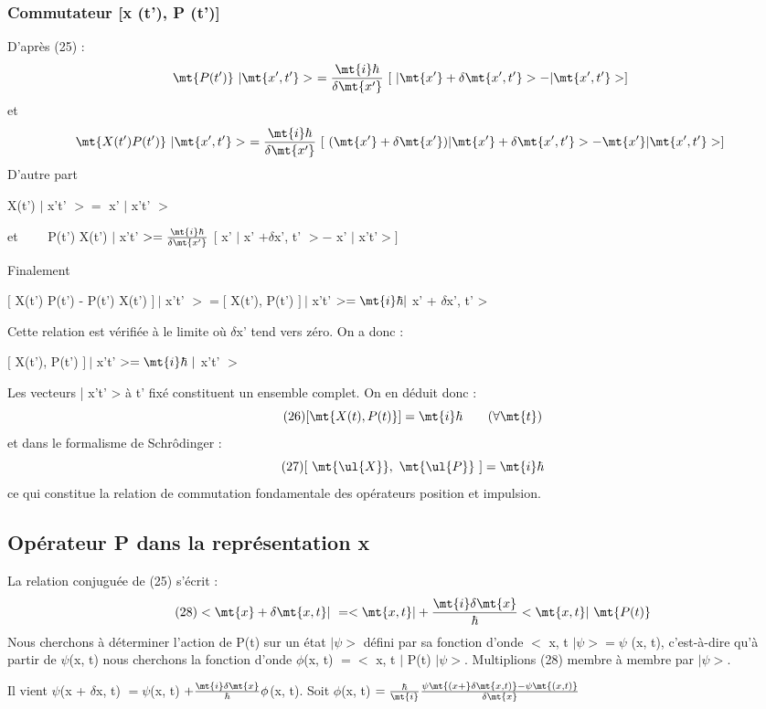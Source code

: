 \subsubsection{Commutateur [x (t'), P (t')]}%
D'après (25) :
\[
\mt{P(t')}\ |\mt{ x', t'}>\ =\frac{\mt{i}\hbar}{\delta\mt{x'}}\ 
[\ |\mt{ x'}+\delta \mt{x', t'}>-|\mt{x', t'}>]
\]
et
\[
\mt{X(t') P(t')}\ |\mt{ x', t'}>\ =
\frac{\mt{i}\hbar}{\delta\mt{x'}}\ 
[\ (\mt{ x'}+\delta \mt{x'})|\mt{ x'}+\delta \mt{x', t'}>-
\mt{ x'}|\mt{x', t'}>]
\]
D'autre part
\begin{center}
X(t') $|$ x't' $> =$ x' $|$ x't' $>$

et \ \ \ \ P(t') X(t') $|$ x't' $> = \frac{\mt{i}\hbar}{\delta\mt{x'}}$
$[$ x' $|$ x' $+ \delta$x', t' $> -$ x' $|$ x't'$>]$
\end{center}
Finalement
\begin{center}
$[$ X(t') P(t') - P(t') X(t') $]\ |$ x't' $> = [$ X(t'), P(t') $]\ |$ x't' $> = \mt{i}\hbar |$ x' + $\delta$x', t' >
\end{center}
Cette relation est vérifiée à le limite où $\delta$x' tend vers zéro.
On a donc :
\begin{center}
$[$ X(t'), P(t') $]\ |$ x't' $> = \mt{i}\hbar\ |$ x't' $>$
\end{center}
Les vecteurs | x't' > à t' fixé constituent un ensemble complet.
On en déduit donc :
\[
\tag{26}[\mt{ X(t), P(t) }]=\mt{i}\hbar\ \ \ \ \ \ (\forall\mt{t})
\]
et dans le formalisme de Schrôdinger :
\[
\tag{27}[\ \mt{\ul{X}},\ \mt{\ul{P}}\ ]=\mt{i}\hbar
\]
ce qui constitue la relation de commutation fondamentale des opérateurs
position et impulsion.

\subsection{Opérateur P dans la représentation x}%

La relation conjuguée de (25) s'écrit :
\[
\tag{28}<\mt{ x}+\delta \mt{x, t }|\ =<\mt{ x, t }|+\frac{\mt{i}\delta\mt{x}}{\hbar}<\mt{ x, t }|\ \mt{ P(t) }
\]
Nous cherchons à déterminer l'action de P(t) sur un état $|\psi>$ défini
par sa fonction d'onde $<$ x, t $|\psi> = \psi$ (x, t), c'est-à-dire qu'à partir
de $\psi$(x, t) nous cherchons la fonction d'onde $\phi$(x, t) $= <$ x, t $|$ P(t) $|\psi>$.
Multiplions (28) membre à membre par $|\psi>$.

Il vient  $\psi$(x + $\delta$x, t) $=\psi$(x, t) $+ \frac{\mt{i}\delta\mt{x}}{\hbar}\phi$(x, t).
Soit  $\phi$(x, t) $=\frac{\hbar}{\mt{i}}\frac{\psi\mt{(x+}\delta\mt{x, t)}-\psi\mt{(x, t)}}{\delta\mt{x}}$


